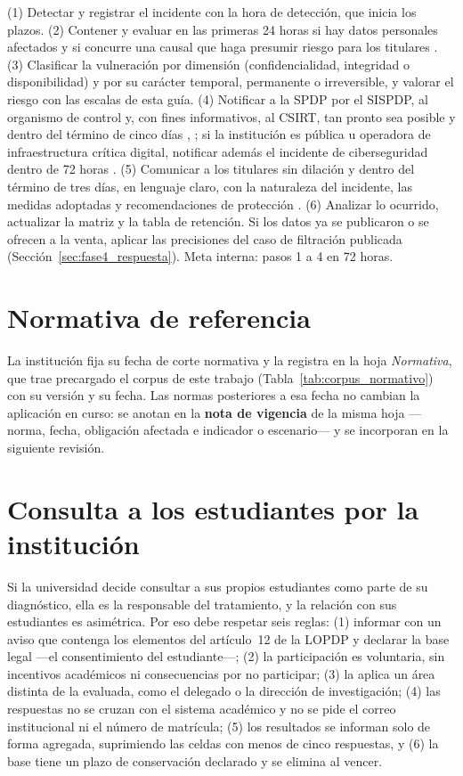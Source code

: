 (1) Detectar y registrar el incidente con la hora de detección, que inicia los plazos. (2) Contener y evaluar en las primeras 24 horas si hay datos personales afectados y si concurre una causal que haga presumir riesgo para los titulares \cite[art.~24]{rlopdp2023}. (3) Clasificar la vulneración por dimensión (confidencialidad, integridad o disponibilidad) y por su carácter temporal, permanente o irreversible, y valorar el riesgo con las escalas de esta guía. (4) Notificar a la SPDP por el SISPDP, al organismo de control y, con fines informativos, al CSIRT, tan pronto sea posible y dentro del término de cinco días \cite[art.~43]{lopdp2021}, \cite{spdp2026vulneraciones}; si la institución es pública u operadora de infraestructura crítica digital, notificar además el incidente de ciberseguridad dentro de 72 horas \cite{lofc2026}. (5) Comunicar a los titulares sin dilación y dentro del término de tres días, en lenguaje claro, con la naturaleza del incidente, las medidas adoptadas y recomendaciones de protección \cite[art.~46]{lopdp2021}. (6) Analizar lo ocurrido, actualizar la matriz y la tabla de retención. Si los datos ya se publicaron o se ofrecen a la venta, aplicar las precisiones del caso de filtración publicada (Sección~\ref{sec:fase4_respuesta}). Meta interna: pasos 1 a 4 en 72 horas.

\section{Normativa de referencia}
\label{sec:guia_normativa}

La institución fija su fecha de corte normativa y la registra en la hoja \textit{Normativa}, que trae precargado el corpus de este trabajo (Tabla~\ref{tab:corpus_normativo}) con su versión y su fecha. Las normas posteriores a esa fecha no cambian la aplicación en curso: se anotan en la \textbf{nota de vigencia} de la misma hoja ---norma, fecha, obligación afectada e indicador o escenario--- y se incorporan en la siguiente revisión.

\section{Consulta a los estudiantes por la institución}
\label{sec:guia_encuesta}

Si la universidad decide consultar a sus propios estudiantes como parte de su diagnóstico, ella es la responsable del tratamiento, y la relación con sus estudiantes es asimétrica. Por eso debe respetar seis reglas: (1) informar con un aviso que contenga los elementos del artículo~12 de la LOPDP y declarar la base legal ---el consentimiento del estudiante---; (2) la participación es voluntaria, sin incentivos académicos ni consecuencias por no participar; (3) la aplica un área distinta de la evaluada, como el delegado o la dirección de investigación; (4) las respuestas no se cruzan con el sistema académico y no se pide el correo institucional ni el número de matrícula; (5) los resultados se informan solo de forma agregada, suprimiendo las celdas con menos de cinco respuestas, y (6) la base tiene un plazo de conservación declarado y se elimina al vencer.

